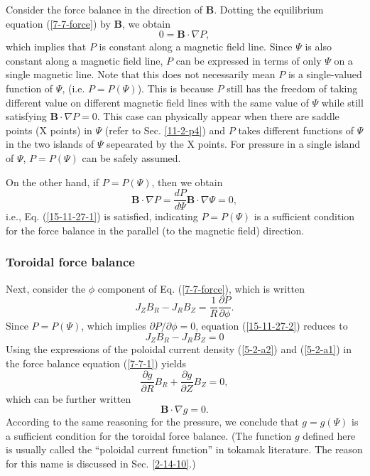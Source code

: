 \documentclass{article}
\begin{document}
Consider the force balance in the direction of $\mathbf{B}$. Dotting the
equilibrium equation (\ref{7-7-force}) by $\mathbf{B}$, we obtain
\begin{equation}
  \label{15-11-27-1} 0 =\mathbf{B} \cdot \nabla P,
\end{equation}
which implies that $P$ is constant along a magnetic field line. Since $\Psi$
is also constant along a magnetic field line, $P$ can be expressed in terms of
only $\Psi$ on a single magnetic line. Note that this does not necessarily
mean $P$ is a single-valued function of $\Psi$, (i.e. $P = P (\Psi)$). This is
because $P$ still has the freedom of taking different value on different
magnetic field lines with the same value of $\Psi$ while still satisfying
$\mathbf{B} \cdot \nabla P = 0$. This case can physically appear when there
are saddle points (X points) in $\Psi$ (refer to Sec. \ref{11-2-p4}) and $P$
takes different functions of $\Psi$ in the two islands of $\Psi$ sepearated by
the X points. For pressure in a single island of $\Psi$, $P = P (\Psi)$ can be
safely assumed.

On the other hand, if $P = P (\Psi)$, then we obtain
\[ \mathbf{B} \cdot \nabla P = \frac{d P}{d \Psi} \mathbf{B} \cdot \nabla \Psi
   = 0, \]
i.e., Eq. (\ref{15-11-27-1}) is satisfied, indicating $P = P (\Psi)$ is a
sufficient condition for the force balance in the parallel (to the magnetic
field) direction.

\subsubsection{Toroidal force balance}

Next, consider the $\phi$ component of Eq. (\ref{7-7-force}), which is written
\begin{equation}
  \label{15-11-27-2} J_Z B_R - J_R B_Z = \frac{1}{R} \frac{\partial
  P}{\partial \phi} .
\end{equation}
Since $P = P (\Psi)$, which implies $\partial P / \partial \phi = 0$, equation
(\ref{15-11-27-2}) reduces to
\begin{equation}
  \label{7-7-1} J_Z B_R - J_R B_Z = 0
\end{equation}
Using the expressions of the poloidal current density (\ref{5-2-a2}) and
(\ref{5-2-a1}) in the force balance equation (\ref{7-7-1}) yields
\begin{equation}
  \label{7-8-fai} \frac{\partial g}{\partial R} B_R + \frac{\partial
  g}{\partial Z} B_Z = 0,
\end{equation}
which can be further written
\begin{equation}
  \label{9-7-1} \mathbf{B} \cdot \nabla g = 0.
\end{equation}
According to the same reasoning for the pressure, we conclude that $g = g
(\Psi)$ is a sufficient condition for the toroidal force balance. (The
function $g$ defined here is usually called the ``poloidal current function''
in tokamak literature. The reason for this name is discussed in Sec.
\ref{2-14-10}.)
\end{document}
